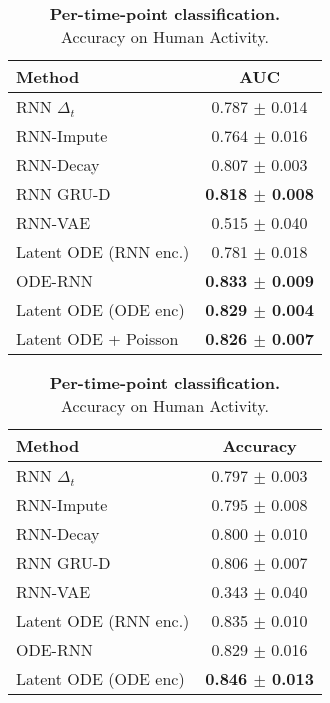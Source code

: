 \documentclass{article}
\begin{document}
\begin{table}
    \vspace{-4mm}
    \parbox{0.45\linewidth}{
    	\centering
    	\captionsetup{justification=centering}
        \caption{\textbf{Per-sequence classification.}\\ AUC on Physionet.}
    	\label{tab:phys_classif}
        \begin{tabular}{@{}lc@{}}
        \toprule
        Method & AUC\\
        \midrule
        RNN $\Delta_t$ & 0.787 $\pm$ 0.014  \\
        RNN-Impute & 0.764 $\pm$ 0.016\\
        RNN-Decay & 0.807 $\pm$ 0.003  \\
        RNN GRU-D & \textbf{0.818 $\pm$ 0.008}  \\
RNN-VAE & 0.515 $\pm$ 0.040\\
        Latent ODE (RNN enc.) & 0.781 $\pm$ 0.018 \\
        \addlinespace[2pt]
        \hdashline
        \addlinespace[2pt]
        ODE-RNN & \textbf{0.833 $\pm$ 0.009} \\
        Latent ODE (ODE enc) & \textbf{0.829 $\pm$ 0.004}\\
        Latent ODE + Poisson & \textbf{0.826 $\pm$ 0.007}\\
        \bottomrule
        \end{tabular}
  }
    \hfill
    \parbox{0.45\linewidth}{ 
    	\centering
    	\captionsetup{justification=centering}
        \caption{\textbf{Per-time-point classification.}\\ Accuracy on Human Activity.}
    	\label{tab:human_activity_classif}
        \begin{tabular}{@{}lc@{}}
        \toprule
        Method &  Accuracy\\
        \midrule
        RNN $\Delta_t$ &  0.797 $\pm$ 0.003 \\
        RNN-Impute &  0.795 $\pm$ 0.008 \\
        RNN-Decay  & 0.800 $\pm$ 0.010 \\
        RNN GRU-D &  0.806 $\pm$ 0.007 \\
        RNN-VAE &   0.343 $\pm$ 0.040\\
        Latent ODE (RNN enc.) & 0.835 $\pm$ 0.010 \\
        \addlinespace[2pt]
        \hdashline
        \addlinespace[2pt]
        ODE-RNN &  0.829 $\pm$ 0.016 \\
        Latent ODE (ODE enc) &  \textbf{0.846 $\pm$ 0.013} \\
        \bottomrule
        \end{tabular}
    }
    \vspace{-4mm}
\end{table}
\end{document}
